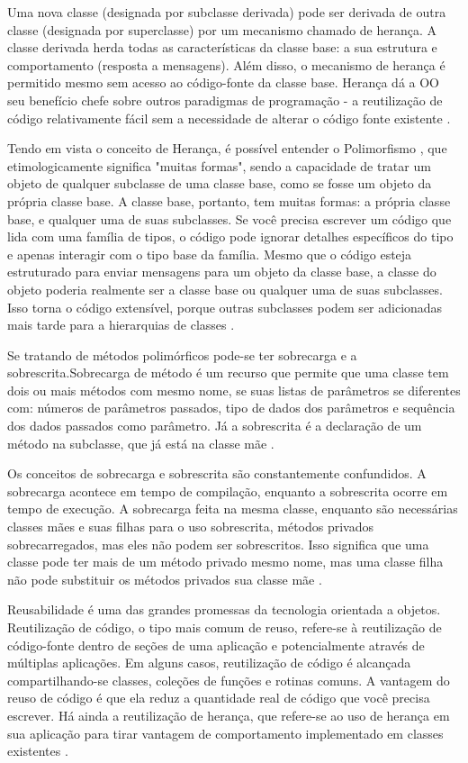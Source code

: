 Uma nova classe (designada por subclasse derivada) pode ser derivada de outra classe (designada por superclasse) por um mecanismo chamado de herança. A classe derivada herda todas as características da classe base: a sua estrutura e comportamento (resposta a mensagens). Além disso, o mecanismo de herança é permitido mesmo sem acesso ao código-fonte da classe base. Herança dá a OO seu benefício chefe sobre outros paradigmas de programação - a reutilização de código relativamente fácil sem a necessidade de alterar o código fonte existente \cite{leavens2014}.

Tendo em vista o conceito de Herança, é possível entender o Polimorfismo , que etimologicamente significa "muitas formas", sendo a capacidade de tratar um objeto de qualquer subclasse de uma classe base, como se fosse um objeto da própria classe base. A classe base, portanto, tem muitas formas: a própria classe base, e qualquer uma de suas subclasses. Se você precisa escrever um código que lida com uma família de tipos, o código pode ignorar detalhes específicos do tipo e apenas interagir com o tipo base da família. Mesmo que o código esteja estruturado para enviar mensagens para um objeto da classe base, a classe do objeto poderia realmente ser a classe base ou qualquer uma de suas subclasses. Isso torna o  código extensível, porque outras subclasses podem ser adicionadas mais tarde para a hierarquias de classes \cite{venners1996}.

Se tratando de métodos polimórficos pode-se ter sobrecarga e a sobrescrita.Sobrecarga de método é um recurso que permite que uma classe tem dois ou mais métodos com mesmo nome, se suas listas de parâmetros se diferentes com: números de parâmetros passados, tipo de dados dos parâmetros e sequência dos dados passados como parâmetro. Já a sobrescrita é a declaração de um método na subclasse, que já está na classe mãe \cite{singhOverload}.

Os conceitos de sobrecarga e sobrescrita são constantemente confundidos. A sobrecarga acontece em tempo de compilação, enquanto a sobrescrita  ocorre em tempo de execução. A sobrecarga  feita na mesma classe, enquanto são necessárias classes mães e suas filhas para o uso sobrescrita, métodos privados sobrecarregados, mas eles não podem ser sobrescritos. Isso significa que uma classe pode ter mais de um método privado mesmo nome, mas uma classe filha não pode substituir os métodos privados sua classe mãe \cite{singhDifference}.

Reusabilidade é uma das grandes promessas da tecnologia orientada a objetos. Reutilização de código, o tipo mais comum de reuso, refere-se à reutilização de código-fonte dentro de seções de uma aplicação e potencialmente através de múltiplas aplicações. Em alguns casos, reutilização de código é alcançada compartilhando-se classes, coleções de funções e rotinas comuns. A vantagem do reuso de código é que ela reduz a quantidade real de código que você precisa escrever. Há ainda a reutilização de herança, que refere-se ao uso de herança em sua aplicação para tirar vantagem de comportamento implementado em classes existentes \cite{ambler1998}.

